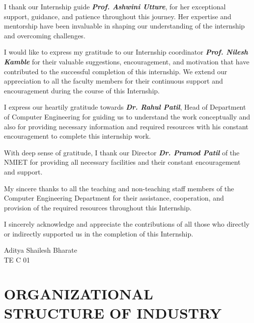 \documentclass[12pt, a4paper, oneside]{report}
\begin{document}
I thank our Internship guide \textbf{\textit{Prof. Ashwini Utture}}, for her exceptional support, 
guidance, and patience throughout this journey. Her expertise and mentorship have been 
invaluable in shaping our understanding of the internship and overcoming challenges.

I would like to express my gratitude to our Internship coordinator \textbf{\textit{Prof. Nilesh Kamble}} 
for their valuable suggestions, encouragement, and motivation that have contributed to the 
successful completion of this internship. We extend our appreciation to all the faculty members 
for their continuous support and encouragement during the course of this Internship.

I express our heartily gratitude towards \textbf{\textit{Dr. Rahul Patil}}, Head of Department of 
Computer Engineering for guiding us to understand the work conceptually and also for 
providing necessary information and required resources with his constant encouragement to 
complete this internship work.

With deep sense of gratitude, I thank our Director \textbf{\textit{Dr. Pramod Patil}}
of the NMIET for providing all necessary facilities and their constant encouragement and 
support.

My sincere thanks to all the teaching and non-teaching staff members of the Computer 
Engineering Department for their assistance, cooperation, and provision of the required 
resources throughout this Internship. 

I sincerely acknowledge and appreciate the contributions of all those who directly or 
indirectly supported us in the completion of this Internship.
\vspace{3cm}

\begin{flushright}
Aditya Shailesh Bharate\\
TE C 01
\end{flushright}


\newpage
\tableofcontents
\thispagestyle{fancy}


\clearpage
{}
\setcounter{page}{1}
\chapter{ORGANIZATIONAL STRUCTURE OF INDUSTRY}
\end{document}

